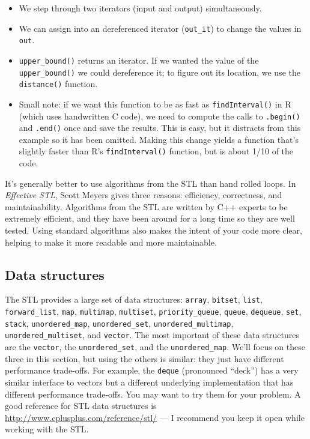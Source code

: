 \begin{itemize}
\item
  We step through two iterators (input and output) simultaneously.
\item
  We can assign into an dereferenced iterator (\texttt{out\_it}) to
  change the values in \texttt{out}.
\item
  \texttt{upper\_bound()} returns an iterator. If we wanted the value of
  the \texttt{upper\_bound()} we could dereference it; to figure out its
  location, we use the \texttt{distance()} function.
\item
  Small note: if we want this function to be as fast as
  \texttt{findInterval()} in R (which uses handwritten C code), we need
  to compute the calls to \texttt{.begin()} and \texttt{.end()} once and
  save the results. This is easy, but it distracts from this example so
  it has been omitted. Making this change yields a function that's
  slightly faster than R's \texttt{findInterval()} function, but is
  about 1/10 of the code.
\end{itemize}

It's generally better to use algorithms from the STL than hand rolled
loops. In \emph{Effective STL}, Scott Meyers gives three reasons:
efficiency, correctness, and maintainability. Algorithms from the STL
are written by C++ experts to be extremely efficient, and they have been
around for a long time so they are well tested. Using standard
algorithms also makes the intent of your code more clear, helping to
make it more readable and more maintainable.

\subsection{Data structures}\label{data-structures-rcpp}

The STL provides a large set of data structures: \texttt{array},
\texttt{bitset}, \texttt{list}, \texttt{forward\_list}, \texttt{map},
\texttt{multimap}, \texttt{multiset}, \texttt{priority\_queue},
\texttt{queue}, \texttt{dequeue}, \texttt{set}, \texttt{stack},
\texttt{unordered\_map}, \texttt{unordered\_set},
\texttt{unordered\_multimap}, \texttt{unordered\_multiset}, and
\texttt{vector}. The most important of these data structures are the
\texttt{vector}, the \texttt{unordered\_set}, and the
\texttt{unordered\_map}. We'll focus on these three in this section, but
using the others is similar: they just have different performance
trade-offs. For example, the \texttt{deque} (pronounced ``deck'') has a
very similar interface to vectors but a different underlying
implementation that has different performance trade-offs. You may want
to try them for your problem. A good reference for STL data structures
is \url{http://www.cplusplus.com/reference/stl/} --- I recommend you
keep it open while working with the STL.

